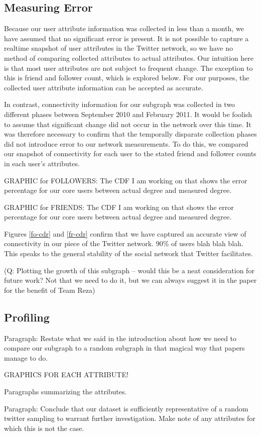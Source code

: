 \subsection{Measuring Error}

Because our user attribute information was collected in less than a month, we have assumed that no significant error is present.  It is not possible to capture a realtime snapshot of user attributes in the Twitter network, so we have no method of comparing collected attributes to actual attributes.  Our intuition here is that most user attributes are not subject to frequent change.  The exception to this is friend and follower count, which is explored below.  For our purposes, the collected user attribute information can be accepted as accurate.

In contrast, connectivity information for our subgraph was collected in two different phases between September 2010 and February 2011.  It would be foolish to assume that significant change did not occur in the network over this time.  It was therefore necessary to confirm that the temporally disparate collection phases did not introduce error to our network measurements.  To do this, we compared our snapshot of connectivity for each user to the stated friend and follower counts in each user's attributes.

GRAPHIC for FOLLOWERS: The CDF I am working on that shows the error percentage for our core users between actual degree and measured degree.

GRAPHIC for FRIENDS: The CDF I am working on that shows the error percentage for our core users between actual degree and measured degree.

Figures \ref{fo-cdr} and \ref{fr-cdr} confirm that we have captured an accurate view of connectivity in our piece of the Twitter network.  90\% of users blah blah blah.  This speaks to the general stability of the social network that Twitter facilitates.

(Q: Plotting the growth of this subgraph -- would this be a neat consideration for future work?  Not that we need to do it, but we can always suggest it in the paper for the benefit of Team Reza)

\subsection{Profiling}

Paragraph: Restate what we said in the introduction about how we need to compare our subgraph to a random subgraph in that magical way that papers manage to do.

GRAPHICS FOR EACH ATTRIBUTE!

Paragraphs summarizing the attributes.

Paragraph: Conclude that our dataset is sufficiently representative of a random twitter sampling to warrant further investigation.  Make note of any attributes for which this is not the case.

